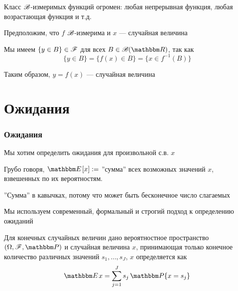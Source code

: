\begin{frame}

    \vspace{2em}
    Класс $\mathscr B$-измеримых функций огромен: любая непрерывная функция,
    любая возрастающая функция и т.д.
    
    \vspace{1em}
    Предположим, что $f$ $\mathscr B$-измерима и $x$
    --- случайная величина
    
    Мы имеем $\{y \in B\} \in \mathscr F$ для всех $B \in \bB(\RR)$, так как
    \begin{equation}
        \label{eq:byim}
        \{y \in B\} = \{f(x) \in B\} = \{x \in f^{-1}(B)\}
    \end{equation}
    
    Таким образом, $y =f(x)$ --- случайная величина
    
\end{frame}
    
\section{Ожидания}


\begin{frame}

    \frametitle{Ожидания}
    
    \vspace{2em}
    Мы хотим определить ожидания для произвольной с.в. $x$

    Грубо говоря, $\EE[x] :=$ ''сумма'' всех возможных значений $x$,
    взвешенных по их вероятностям.  

    ''Сумма'' в кавычках, потому что может быть бесконечное число слагаемых
    
    Мы используем современный, формальный и строгий подход к определению ожиданий

\end{frame}

\begin{frame}

    \vspace{2em}
    Для конечных случайных величин дано вероятностное пространство $(\Omega, \fF, \PP)$ 
    и случайная величина $x$, 
    принимающая только конечное количество различных значений $s_1, \ldots, s_J$,
     $x$ определяется как
    \begin{equation}
        \label{eq:expec}
        \EE x = \sum_{j=1}^J s_j \, \PP\{x = s_j\}
    \end{equation} 
    
\end{frame}

